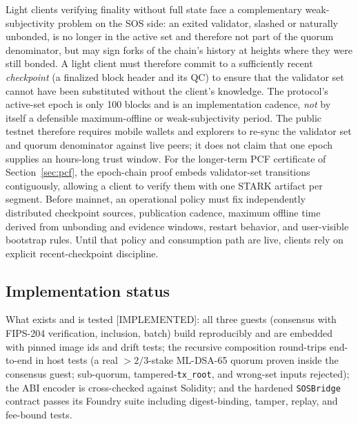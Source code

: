 \documentclass[11pt]{article}
\newcommand{\code}[1]{\texttt{#1}}
\newcommand{\mldsa}{ML\mbox{-}DSA\mbox{-}65}
\newcommand{\statusI}{\textcolor{statgreen}{\textsf{\scriptsize[IMPLEMENTED]}}}
\theoremstyle{plain}
\theoremstyle{definition}
\theoremstyle{remark}
\begin{document}
Light clients verifying finality without full state face a complementary
weak-subjectivity problem on the SOS side: an exited validator, slashed or
naturally unbonded, is no longer in the active set and therefore not part of
the quorum denominator, but may sign forks of the chain's history at heights
where they were still bonded. A light client must therefore commit to a
sufficiently recent \emph{checkpoint} (a finalized block header and its QC) to
ensure that the validator set cannot have been substituted without the client's
knowledge. The protocol's active-set epoch is only 100 blocks and is an
implementation cadence, \emph{not} by itself a defensible maximum-offline or
weak-subjectivity period. The public testnet therefore requires mobile wallets
and explorers to re-sync the validator set and quorum denominator against live
peers; it does not claim that one epoch supplies an hours-long trust window. For
the longer-term PCF certificate of Section~\ref{sec:pcf}, the epoch-chain proof
embeds validator-set transitions contiguously, allowing a client to verify them
with one STARK artifact per segment. Before mainnet, an operational policy must
fix independently distributed checkpoint sources, publication cadence,
maximum offline time derived from unbonding and evidence windows, restart
behavior, and user-visible bootstrap rules. Until that policy and consumption
path are live, clients rely on explicit recent-checkpoint discipline.

\subsection{Implementation status}
\label{sec:bridge-status}

What exists and is tested \statusI{}: all three guests (consensus with
FIPS-204 verification, inclusion, batch) build reproducibly and are embedded
with pinned image ids and drift tests; the recursive composition round-trips
end-to-end in host tests (a real $>2/3$-stake \mldsa{} quorum proven inside
the consensus guest; sub-quorum, tampered-\code{tx\_root}, and wrong-set
inputs rejected); the ABI encoder is cross-checked against Solidity; and the
hardened \code{SOSBridge} contract passes its Foundry suite including
digest-binding, tamper, replay, and fee-bound tests.
\end{document}
